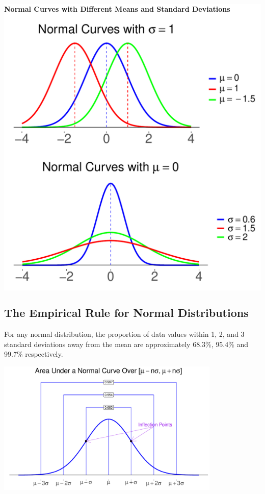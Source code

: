 \begin{fullwidth}
  \colorbox{white}{
    \parbox{\linewidth}{
  \centering
  \textbf{Normal Curves with Different Means and Standard Deviations}

  \begin{multicols*}{2}
    \includegraphics[width=0.8\linewidth]{figure-latex/unnamed-chunk-8-4-1}
    
    \columnbreak

    \includegraphics[width=0.8\linewidth]{figure-latex/unnamed-chunk-8-5-1}
  \end{multicols*}
    }}
\end{fullwidth}


\hypertarget{the-empirical-rule-for-normal-distributions}{%
\subsection{The Empirical Rule for Normal
Distributions}\label{the-empirical-rule-for-normal-distributions}}

For any normal distribution, the proportion of data values within 1, 2,
and 3 standard deviations away from the mean are approximately 68.3\%,
95.4\% and 99.7\% respectively.

\includegraphics[width=0.8\textwidth]{figure-latex/unnamed-chunk-8-6-1}

